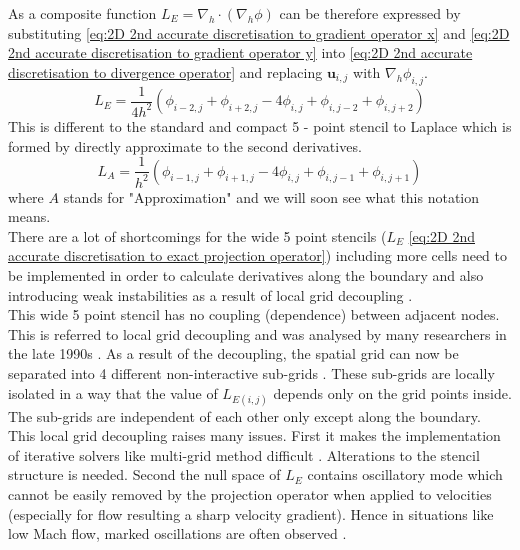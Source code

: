 As a composite function $\textit{L}_E = \nabla_h \cdot (\nabla_h\phi)$ can be therefore expressed by substituting \eqref{eq:2D 2nd accurate discretisation to gradient operator x} and \eqref{eq:2D 2nd accurate discretisation to gradient operator y} into \eqref{eq:2D 2nd accurate discretisation to divergence operator} and replacing $\textbf{u}_{i,j}$ with $\nabla_h \phi_{i,j}$.\\
\begin{equation}\label{eq:2D 2nd accurate discretisation to exact projection operator}
\textit{L}_E = \dfrac{1}{4 h^2} (\phi_{i-2,j} + \phi_{i+2,j} - 4 \phi_{i,j} + \phi_{i,j-2} + \phi_{i,j+2})
\end{equation}
This is different to the standard and compact 5 - point stencil to Laplace which is formed by directly approximate to the second derivatives.
\begin{equation}\label{eq:2D 2nd accurate discretisation to approximate projection operator}
\textit{L}_A = \dfrac{1}{h^2} (\phi_{i-1,j} + \phi_{i+1,j} - 4 \phi_{i,j} + \phi_{i,j-1} + \phi_{i,j+1})
\end{equation}
where $A$ stands for "Approximation" and we will soon see what this notation means.\\

There are a lot of shortcomings for the wide 5 point stencils ($\textit{L}_E$ \eqref{eq:2D 2nd accurate discretisation to exact projection operator}) including more cells need to be implemented in order to calculate derivatives along the boundary and also introducing weak instabilities as a result of local grid decoupling \cite{brown2001accurate,almgren1996numerical,almgren2000approximate,howell1997adaptive,minion1996projection}.\\

This wide 5 point stencil has no coupling (dependence) between adjacent nodes. This is referred to local grid decoupling and was analysed by many researchers in the late 1990s \cite{almgren1996numerical,almgren2000approximate,howell1997adaptive,minion1996projection}. As a result of the decoupling, the spatial grid can now be separated into 4 different non-interactive sub-grids \cite{howell1997adaptive,minion1996projection}. These sub-grids are locally isolated in a way that the value of $\textit{L}_{E (i,j)}$ depends only on the grid points inside. The sub-grids are independent of each other only except along the boundary.\\

This local grid decoupling raises many issues. First it makes the implementation of iterative solvers like multi-grid method difficult \cite{almgren1996numerical,almgren2000approximate,howell1997adaptive}. Alterations to the stencil structure is needed. Second the null space of $\textit{L}_E$ contains oscillatory mode which cannot be easily removed by the projection operator when applied to velocities \cite{minion1996projection} (especially for flow resulting a sharp velocity gradient). Hence in situations like low Mach flow, marked oscillations are often observed \cite{lal1993projection}.\\


